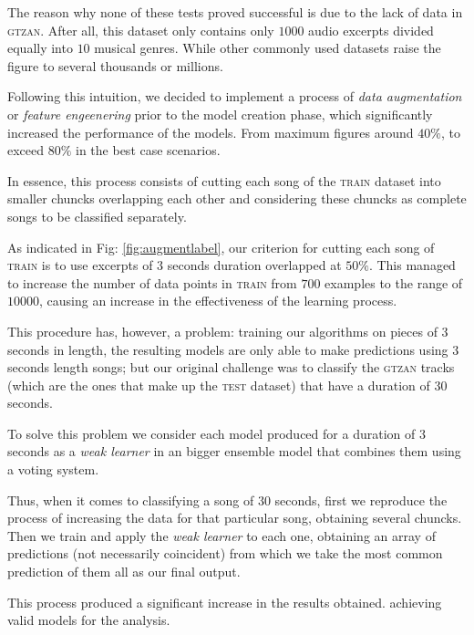 The reason why none of these tests proved successful is due to the lack of data in \textsc{gtzan}. After all, this dataset only contains only $1000$ audio excerpts divided equally into $10$ musical genres. While other commonly used datasets raise the figure to several thousands or millions.

Following this intuition, we decided to implement a process of {\it data augmentation} or {\it feature engeenering} prior to the model creation phase, which significantly increased the performance of the models. From maximum figures around $40\%$, to exceed $80\%$ in the best case scenarios.

In essence, this process consists of cutting each song of the \textsc{train} dataset into smaller chuncks overlapping each other and considering these chuncks as complete songs to be classified separately.


As indicated in Fig: \ref{fig:augmentlabel}, our criterion for cutting each song of \textsc{train} is to use excerpts of $3$ seconds duration overlapped at $50\%$. This managed to increase the number of data points in \textsc{train} from $700$ examples to the range of $10000$, causing an increase in the effectiveness of the learning process.

This procedure has, however, a problem: training our algorithms on pieces of $3$ seconds in length, the resulting models are only able to make predictions using $3$ seconds length songs; but our original challenge was to classify the \textsc{gtzan} tracks (which are the ones that make up the \textsc{test} dataset) that have a duration of $30$ seconds.

To solve this problem we consider each model produced for a duration of $3$ seconds as a {\it weak learner} in an bigger ensemble model that combines them using a voting system.

Thus, when it comes to classifying a song of $30$ seconds, first we reproduce the process of increasing the data for that particular song, obtaining several chuncks. Then we train and apply the {\it weak learner} to each one, obtaining an array of predictions (not necessarily coincident) from which we take the most common prediction of them all as our final output.

This process produced a significant increase in the results obtained. achieving valid models for the analysis.

